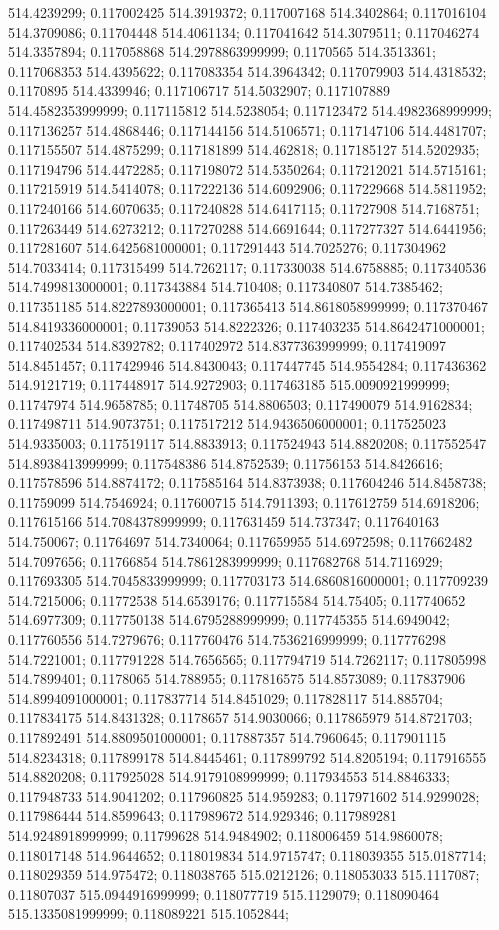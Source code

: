 514.4239299; 0.117002425 514.3919372; 0.117007168 514.3402864; 0.117016104 514.3709086; 0.11704448 514.4061134; 0.117041642 514.3079511; 0.117046274 514.3357894; 0.117058868 514.2978863999999; 0.1170565 514.3513361; 0.117068353 514.4395622; 0.117083354 514.3964342; 0.117079903 514.4318532; 0.1170895 514.4339946; 0.117106717 514.5032907; 0.117107889 514.4582353999999; 0.117115812 514.5238054; 0.117123472 514.4982368999999; 0.117136257 514.4868446; 0.117144156 514.5106571; 0.117147106 514.4481707; 0.117155507 514.4875299; 0.117181899 514.462818; 0.117185127 514.5202935; 0.117194796 514.4472285; 0.117198072 514.5350264; 0.117212021 514.5715161; 0.117215919 514.5414078; 0.117222136 514.6092906; 0.117229668 514.5811952; 0.117240166 514.6070635; 0.117240828 514.6417115; 0.11727908 514.7168751; 0.117263449 514.6273212; 0.117270288 514.6691644; 0.117277327 514.6441956; 0.117281607 514.6425681000001; 0.117291443 514.7025276; 0.117304962 514.7033414; 0.117315499 514.7262117; 0.117330038 514.6758885; 0.117340536 514.7499813000001; 0.117343884 514.710408; 0.117340807 514.7385462; 0.117351185 514.8227893000001; 0.117365413 514.8618058999999; 0.117370467 514.8419336000001; 0.11739053 514.8222326; 0.117403235 514.8642471000001; 0.117402534 514.8392782; 0.117402972 514.8377363999999; 0.117419097 514.8451457; 0.117429946 514.8430043; 0.117447745 514.9554284; 0.117436362 514.9121719; 0.117448917 514.9272903; 0.117463185 515.0090921999999; 0.11747974 514.9658785; 0.11748705 514.8806503; 0.117490079 514.9162834; 0.117498711 514.9073751; 0.117517212 514.9436506000001; 0.117525023 514.9335003; 0.117519117 514.8833913; 0.117524943 514.8820208; 0.117552547 514.8938413999999; 0.117548386 514.8752539; 0.11756153 514.8426616; 0.117578596 514.8874172; 0.117585164 514.8373938; 0.117604246 514.8458738; 0.11759099 514.7546924; 0.117600715 514.7911393; 0.117612759 514.6918206; 0.117615166 514.7084378999999; 0.117631459 514.737347; 0.117640163 514.750067; 0.11764697 514.7340064; 0.117659955 514.6972598; 0.117662482 514.7097656; 0.11766854 514.7861283999999; 0.117682768 514.7116929; 0.117693305 514.7045833999999; 0.117703173 514.6860816000001; 0.117709239 514.7215006; 0.11772538 514.6539176; 0.117715584 514.75405; 0.117740652 514.6977309; 0.117750138 514.6795288999999; 0.117745355 514.6949042; 0.117760556 514.7279676; 0.117760476 514.7536216999999; 0.117776298 514.7221001; 0.117791228 514.7656565; 0.117794719 514.7262117; 0.117805998 514.7899401; 0.1178065 514.788955; 0.117816575 514.8573089; 0.117837906 514.8994091000001; 0.117837714 514.8451029; 0.117828117 514.885704; 0.117834175 514.8431328; 0.1178657 514.9030066; 0.117865979 514.8721703; 0.117892491 514.8809501000001; 0.117887357 514.7960645; 0.117901115 514.8234318; 0.117899178 514.8445461; 0.117899792 514.8205194; 0.117916555 514.8820208; 0.117925028 514.9179108999999; 0.117934553 514.8846333; 0.117948733 514.9041202; 0.117960825 514.959283; 0.117971602 514.9299028; 0.117986444 514.8599643; 0.117989672 514.929346; 0.117989281 514.9248918999999; 0.11799628 514.9484902; 0.118006459 514.9860078; 0.118017148 514.9644652; 0.118019834 514.9715747; 0.118039355 515.0187714; 0.118029359 514.975472; 0.118038765 515.0212126; 0.118053033 515.1117087; 0.11807037 515.0944916999999; 0.118077719 515.1129079; 0.118090464 515.1335081999999; 0.118089221 515.1052844; 